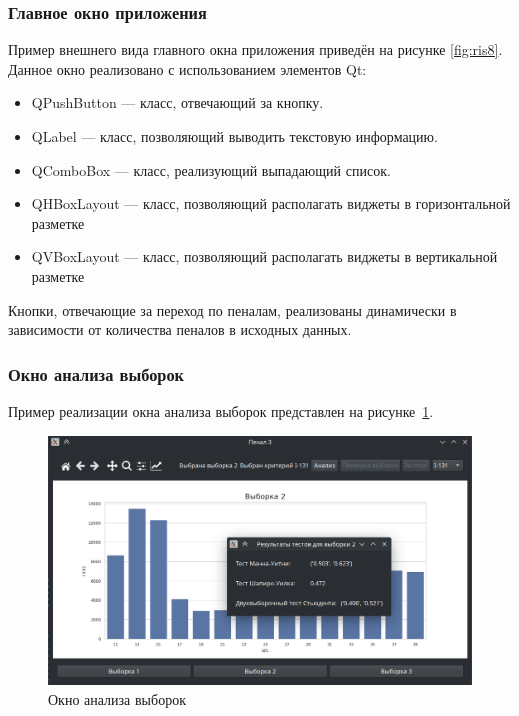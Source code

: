 \subsubsection{Главное окно приложения}

Пример внешнего вида главного окна приложения приведён на рисунке \ref{fig:ris8}. Данное окно реализовано с использованием элементов Qt:

\begin{itemize}
	\item QPushButton --- класс, отвечающий за кнопку.
	\item QLabel --- класс, позволяющий выводить текстовую информацию.
	\item QComboBox --- класс, реализующий выпадающий список.
	\item QHBoxLayout --- класс, позволяющий располагать виджеты в горизонтальной разметке
	\item QVBoxLayout --- класс, позволяющий располагать виджеты в вертикальной разметке
\end{itemize}

Кнопки, отвечающие за переход по пеналам, реализованы динамически в зависимости от количества пеналов в исходных данных.

\subsubsection{Окно анализа выборок}

Пример реализации окна анализа выборок представлен на рисунке~\ref{fig:ris10}.

\begin{figure}[H]
	\centering
	\includegraphics[width=1\linewidth]{pics/ris10} %
	\caption{Окно анализа выборок}
	\label{fig:ris10} %
\end{figure}

